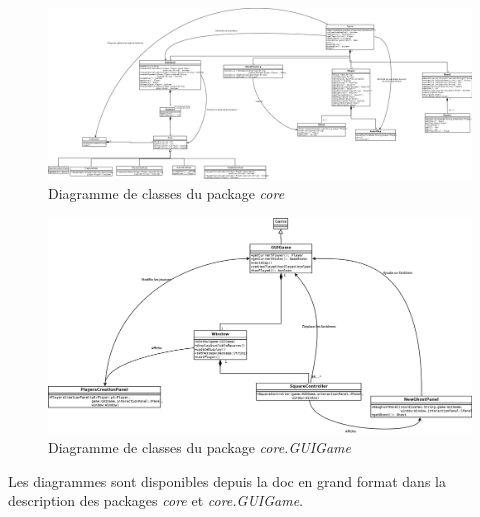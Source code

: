 \documentclass[]{report}
\begin{document}
\begin{figure}[!h]
	\caption{Diagramme de classes du package \textit{core}}
	\includegraphics[width=\textwidth]{core.png}
\end{figure}

\begin{figure}[!h]
	\caption{Diagramme de classes du package \textit{core.GUIGame}}
	\includegraphics[width=\textwidth]{core_GUIGame.png}
\end{figure}

Les diagrammes sont disponibles depuis la doc en grand format dans la description des packages \textit{core} et \textit{core.GUIGame}.
\end{document}
